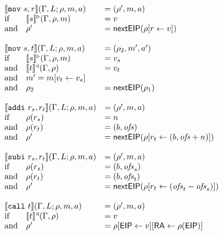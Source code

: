 \begin{small}
\[
\begin{array}{lll}
  \multicolumn{2}{l}{\llbracket \mathtt{mov}~ s, r \rrbracket(\Gamma, L; \rho, m, a)} & = (\rho', m, a) \\
    \text{if} &  \llbracket s \rrbracket ^ \triangleright(\Gamma, \rho, m) & = v \\
    \text{and} & \rho' & = \mathsf{nextEIP}(\rho[r \leftarrow v]) \\
\\
  \multicolumn{2}{l}{\llbracket \mathtt{mov}~ s, t \rrbracket(\Gamma, L; \rho, m, a)} & = (\rho_2, m', a') \\
    \text{if} &  \llbracket s \rrbracket ^ \triangleright(\Gamma, \rho, m) & = v_s \\
    \text{and} &  \llbracket t \rrbracket ^ \triangleleft(\Gamma, \rho) & = v_t \\
    \text{and} & m' = m[v_t \leftarrow v_s] \\
    \text{and} & \rho_2 & = \mathsf{nextEIP}(\rho_1) \\
   \\
  \multicolumn{2}{l}{\llbracket \mathtt{addi}~ r_s, r_t \rrbracket(\Gamma, L; \rho, m, a)} & = (\rho', m, a) \\
  \text{if} & \rho(r_s) & = n \\
  \text{and} & \rho(r_t) & = (b, \mathit{ofs}) \\
  \text{and} & \rho' & = \mathsf{nextEIP}(\rho[r_t \leftarrow (b, \mathit{ofs}+n)]) \\
\\
  \multicolumn{2}{l}{\llbracket \mathtt{subi}~ r_s, r_t \rrbracket(\Gamma, L; \rho, m, a)} & = (\rho', m, a) \\
  \text{if} & \rho(r_s) & = (b, \mathit{ofs}_s) \\
  \text{and} & \rho(r_t) & = (b, \mathit{ofs}_t) \\
  \text{and} & \rho' & = \mathsf{nextEIP}(\rho[r_t \leftarrow (\mathit{ofs}_t - \mathit{ofs}_s)]) \\
\\
  \multicolumn{2}{l}{ \llbracket \mathtt{call} ~ t \rrbracket(\Gamma, L; \rho, m, a)} & = (\rho', m, a) \\
  \text{if} & \llbracket t \rrbracket^\triangleleft(\Gamma, \rho) & = v \\
  \text{and} & \rho' & = \rho[\mathsf{EIP} \leftarrow v][\mathsf{RA} \leftarrow \rho(\mathsf{EIP})] \\
\\

\end{array}\]
\end{small}

